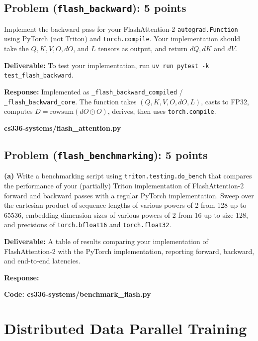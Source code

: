 \documentclass[11pt]{article}
\begin{document}
\subsection*{Problem (\texttt{flash\_backward}): 5 points}

Implement the backward pass for your FlashAttention-2 \texttt{autograd.Function} using PyTorch (not Triton) and \texttt{torch.compile}. Your implementation should take the $Q, K, V, O, dO$, and $L$ tensors as output, and return $dQ, dK$ and $dV$.

\textbf{Deliverable:} To test your implementation, run \texttt{uv run pytest -k test\_flash\_backward}.

\vspace{0.25cm}
\textbf{Response:} Implemented as \verb|_flash_backward_compiled| / \verb|_flash_backward_core|. The function takes $(Q, K, V, O, dO, L)$, casts to FP32, computes $D = \text{rowsum}(dO \odot O)$, derives, then uses \texttt{torch.compile}.

\textbf{cs336-systems/flash\_attention.py}

\subsection*{Problem (\texttt{flash\_benchmarking}): 5 points}

\textbf{(a)} Write a benchmarking script using \texttt{triton.testing.do\_bench} that compares the performance of your (partially) Triton implementation of FlashAttention-2 forward and backward passes with a regular PyTorch implementation. Sweep over the cartesian product of sequence lengths of various powers of 2 from 128 up to 65536, embedding dimension sizes of various powers of 2 from 16 up to size 128, and precisions of \texttt{torch.bfloat16} and \texttt{torch.float32}.

\textbf{Deliverable:} A table of results comparing your implementation of FlashAttention-2 with the PyTorch implementation, reporting forward, backward, and end-to-end latencies.

\vspace{0.25cm}
\textbf{Response:}


\textbf{Code: cs336-systems/benchmark\_flash.py}

\section{Distributed Data Parallel Training}
\end{document}
